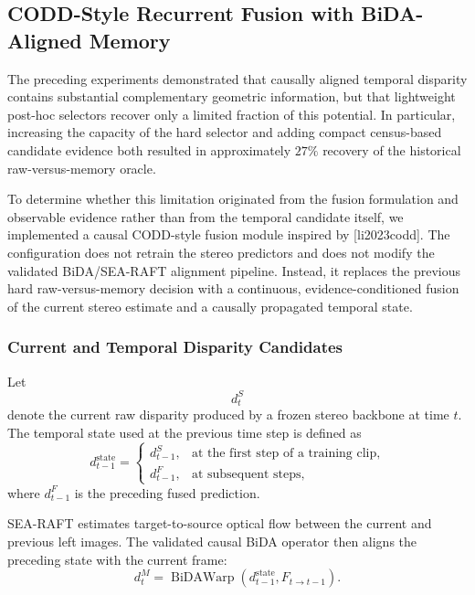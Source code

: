 \documentclass[11pt,a4paper]{article}
\providecommand{\citet}[1]{[#1]}
\begin{document}
\subsection{CODD-Style Recurrent Fusion with BiDA-Aligned Memory}
\label{sec:codd_style_configuration}

The preceding experiments demonstrated that causally aligned temporal disparity contains
substantial complementary geometric information, but that lightweight post-hoc selectors
recover only a limited fraction of this potential. In particular, increasing the capacity
of the hard selector and adding compact census-based candidate evidence both resulted in
approximately \(27\%\) recovery of the historical raw-versus-memory oracle.

To determine whether this limitation originated from the fusion formulation and observable
evidence rather than from the temporal candidate itself, we implemented a causal
CODD-style fusion module inspired by \citet{li2023codd}. The configuration does not
retrain the stereo predictors and does not modify the validated BiDA/SEA-RAFT alignment
pipeline. Instead, it replaces the previous hard raw-versus-memory decision with a
continuous, evidence-conditioned fusion of the current stereo estimate and a causally
propagated temporal state.

\subsubsection{Current and Temporal Disparity Candidates}

Let
\begin{equation}
    d_t^{S}
\end{equation}
denote the current raw disparity produced by a frozen stereo backbone at time \(t\).
The temporal state used at the previous time step is defined as
\begin{equation}
    d_{t-1}^{\mathrm{state}}
    =
    \begin{cases}
        d_{t-1}^{S},
        & \text{at the first step of a training clip},\\[2mm]
        d_{t-1}^{F},
        & \text{at subsequent steps},
    \end{cases}
    \label{eq:codd_state_definition}
\end{equation}
where \(d_{t-1}^{F}\) is the preceding fused prediction.

SEA-RAFT estimates target-to-source optical flow between the current and previous left
images. The validated causal BiDA operator then aligns the preceding state with the
current frame:
\begin{equation}
    d_t^{M}
    =
    \operatorname{BiDAWarp}
    \left(
        d_{t-1}^{\mathrm{state}},
        F_{t\rightarrow t-1}
    \right).
    \label{eq:codd_bida_memory}
\end{equation}
\end{document}
